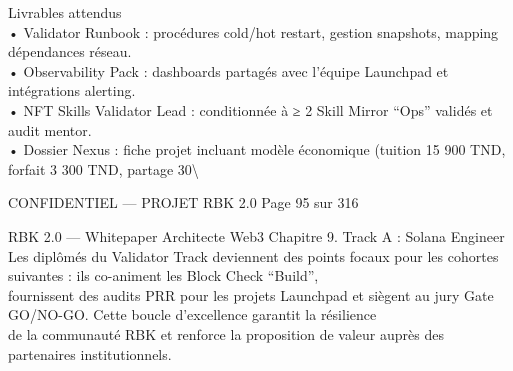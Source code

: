 \vspace{0.5em}
\vspace{0.5em}
\vspace{0.5em}
Livrables attendus\\
\vspace{0.5em}
• Validator Runbook : procédures cold/hot restart, gestion snapshots, mapping dépendances réseau.\\
\vspace{0.5em}
• Observability Pack : dashboards partagés avec l’équipe Launchpad et intégrations alerting.\\
\vspace{0.5em}
• NFT Skills Validator Lead : conditionnée à ≥ 2 Skill Mirror “Ops” validés et audit mentor.\\
\vspace{0.5em}
• Dossier Nexus : fiche projet incluant modèle économique (tuition 15 900 TND, forfait 3 300 TND, partage 30\textbackslash{}%
\vspace{0.5em}
\vspace{0.5em}
\begin{confidential}CONFIDENTIEL — PROJET RBK 2.0                                 Page 95 sur 316\end{confidential}
RBK 2.0 — Whitepaper Architecte Web3                                                                      Chapitre 9. Track A : Solana Engineer\\
\vspace{0.5em}
\vspace{0.5em}
Les diplômés du Validator Track deviennent des points focaux pour les cohortes suivantes : ils co-animent les Block Check “Build”,\\
fournissent des audits PRR pour les projets Launchpad et siègent au jury Gate GO/NO-GO. Cette boucle d’excellence garantit la résilience\\
de la communauté RBK et renforce la proposition de valeur auprès des partenaires institutionnels.\\
\vspace{0.5em}
\vspace{0.5em}
